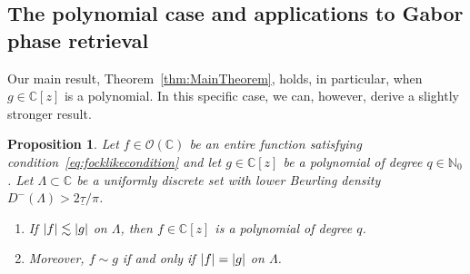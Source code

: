 \documentclass{article}
\newcommand{\bbC}{\mathbb{C}}
\newcommand{\bbN}{\mathbb{N}}
\newcommand{\calO}{\mathcal{O}}
\DeclarePairedDelimiter{\abs}{\lvert}{\rvert}
\newtheorem{proposition}{Proposition}
\theoremstyle{remark}
\begin{document}
    \subsection{The polynomial case and applications to Gabor phase retrieval}\label{sec:Polynomials}

    Our main result, Theorem~\ref{thm:MainTheorem}, holds, in particular, when $g \in \bbC[z]$ is a polynomial. In this specific case, we can, however, derive a slightly stronger result.

    \begin{proposition}\label{prop:PolynomialProposition}
        Let $f \in \calO(\bbC)$ be an entire function satisfying condition~\eqref{eq:focklikecondition} and let $g \in \bbC[z]$ be a polynomial of degree $q \in \bbN_0$. Let $\Lambda \subset \bbC$ be a uniformly discrete set with lower Beurling density $D^{-}(\Lambda) > 2 \underline \tau / \pi$. 
        \begin{enumerate}
            \item If $\abs{f} \lesssim \abs{g}$ on $\Lambda$, then $f \in \bbC[z]$ is a polynomial of degree $q$.
            \item Moreover, $f \sim g$ if and only if $\abs{f} = \abs{g}$ on $\Lambda$.
        \end{enumerate}
    \end{proposition}
\end{document}
